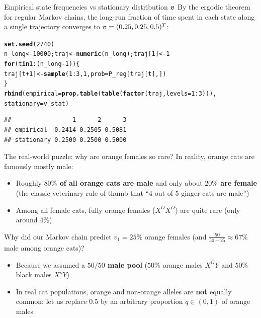 \documentclass[aspectratio=169]{beamer}\usepackage[]{graphicx}\usepackage[]{xcolor}
\makeatletter
\newcommand{\hlnum}[1]{\textcolor[rgb]{0.686,0.059,0.569}{#1}}%
\newcommand{\hlopt}[1]{\textcolor[rgb]{0,0,0}{#1}}%
\newcommand{\hldef}[1]{\textcolor[rgb]{0.345,0.345,0.345}{#1}}%
\newcommand{\hlkwa}[1]{\textcolor[rgb]{0.161,0.373,0.58}{\textbf{#1}}}%
\newcommand{\hlkwb}[1]{\textcolor[rgb]{0.69,0.353,0.396}{#1}}%
\newcommand{\hlkwc}[1]{\textcolor[rgb]{0.333,0.667,0.333}{#1}}%
\newcommand{\hlkwd}[1]{\textcolor[rgb]{0.737,0.353,0.396}{\textbf{#1}}}%
\newenvironment{kframe}{%
 \def\at@end@of@kframe{}%
 \ifinner\ifhmode%
  \def\at@end@of@kframe{\end{minipage}}%
  \begin{minipage}{\columnwidth}%
 \fi\fi%
 \def\FrameCommand##1{\hskip\@totalleftmargin \hskip-\fboxsep
 \colorbox{shadecolor}{##1}\hskip-\fboxsep
     \hskip-\linewidth \hskip-\@totalleftmargin \hskip\columnwidth}%
 \MakeFramed {\advance\hsize-\width
   \@totalleftmargin\z@ \linewidth\hsize
   \@setminipage}}%
 {\par\unskip\endMakeFramed%
 \at@end@of@kframe}
\newenvironment{knitrout}{}{} %
\makeatother
\begin{document}
\begin{frame}[fragile]{Empirical state frequencies vs stationary distribution $\bm{v}$}
By the ergodic theorem for regular Markov chains, the long-run fraction of time spent in each state along a single trajectory converges to $\bm{v} = (0.25, 0.25, 0.5)^T$:
\begin{knitrout}
\color{fgcolor}\begin{kframe}
\begin{alltt}
\hlkwd{set.seed}\hldef{(}\hlnum{2740}\hldef{)}
\hldef{n_long} \hlkwb{<-} \hlnum{10000}\hldef{; traj} \hlkwb{<-} \hlkwd{numeric}\hldef{(n_long); traj[}\hlnum{1}\hldef{]} \hlkwb{<-} \hlnum{1}
\hlkwa{for} \hldef{(t} \hlkwa{in} \hlnum{1}\hlopt{:}\hldef{(n_long} \hlopt{-} \hlnum{1}\hldef{)) \{}
  \hldef{traj[t} \hlopt{+} \hlnum{1}\hldef{]} \hlkwb{<-} \hlkwd{sample}\hldef{(}\hlnum{1}\hlopt{:}\hlnum{3}\hldef{,} \hlnum{1}\hldef{,} \hlkwc{prob} \hldef{= P_reg[traj[t], ])}
\hldef{\}}
\hlkwd{rbind}\hldef{(}\hlkwc{empirical} \hldef{=} \hlkwd{prop.table}\hldef{(}\hlkwd{table}\hldef{(}\hlkwd{factor}\hldef{(traj,} \hlkwc{levels} \hldef{=} \hlnum{1}\hlopt{:}\hlnum{3}\hldef{))),}
      \hlkwc{stationary} \hldef{= v_stat)}
\end{alltt}
\begin{verbatim}
##                 1      2      3
## empirical  0.2414 0.2505 0.5081
## stationary 0.2500 0.2500 0.5000
\end{verbatim}
\end{kframe}
\end{knitrout}
\end{frame}

\begin{frame}{The real-world puzzle: why are orange females so rare?}
In reality, orange cats are famously mostly male:
\begin{itemize}
\item Roughly \textbf{$80\%$ of all orange cats are male} and only about \textbf{$20\%$ are female} (the classic veterinary rule of thumb that ``4 out of 5 ginger cats are male'')
\item Among all female cats, fully orange females ($X^O X^O$) are quite rare (only around $4\%$)
\end{itemize}
\vfill
Why did our Markov chain predict $v_1 = 25\%$ orange females (and $\frac{50}{50 + 25} \approx 67\%$ male among orange cats)?
\begin{itemize}
\item Because we assumed a \textbf{$50/50$ male pool} ($50\%$ orange males $X^O Y$ and $50\%$ black males $X^o Y$)
\item In real cat populations, orange and non-orange alleles are \textbf{not} equally common: let us replace $0.5$ by an arbitrary proportion $q \in (0, 1)$ of orange males
\end{itemize}
\end{frame}
\end{document}
